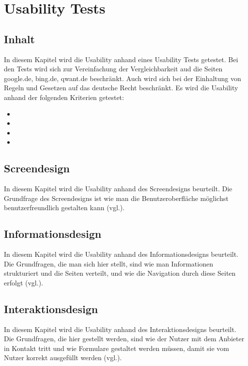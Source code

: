 \section{Usability Tests}\label{sec:usability}

\subsection{Inhalt}\label{subsec:inhalt}
In diesem Kapitel wird die Usability anhand eines Usability Tests getestet.
Bei den Tests wird sich zur Vereinfachung der Vergleichbarkeit aud die Seiten google.de, bing.de, qwant.de beschränkt.
Auch wird sich bei der Einhaltung von Regeln und Gesetzen auf das deutsche Recht beschränkt.\newline
Es wird die Usability anhand der folgenden Kriterien getestet:
\begin{itemize}
    \item{}
    \item{}
    \item{}
    \item{}
\end{itemize}

\subsection{Screendesign}\label{subsec:screendesign}
In diesem Kapitel wird die Usability anhand des Screendesigns beurteilt.
Die Grundfrage des Screendesigns ist wie man die Benutzeroberfläche möglichst benutzerfreundlich gestalten kann (vgl.\cite{Skript4}).

\subsection{Informationsdesign}\label{subsec:informationsdesign}
In diesem Kapitel wird die Usability anhand des Informationsdesigns beurteilt.
Die Grundfragen, die man sich hier stellt,
sind wie man Informationen strukturiert und die Seiten verteilt,
und wie die Navigation durch diese Seiten erfolgt (vgl.\cite{Skript4}).

\subsection{Interaktionsdesign}\label{subsec:interaktionsdesign}
In diesem Kapitel wird die Usability anhand des Interaktionsdesigns beurteilt.
Die Grundfragen, die hier gestellt werden,
sind wie der Nutzer mit dem Anbieter in Kontakt tritt und wie Formulare gestaltet werden müssen,
damit sie vom Nutzer korrekt ausgefüllt werden (vgl.\cite{Skript4}).


